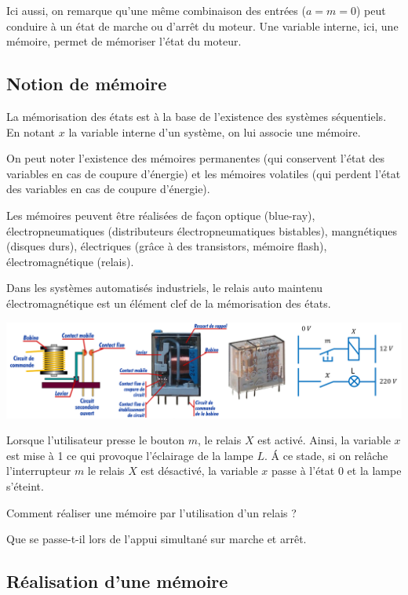 \documentclass[10pt]{article}
\begin{document}
Ici aussi, on remarque qu'une même combinaison des entrées ($a=m=0$) peut conduire à un état de marche ou d'arrêt du moteur. Une variable interne, ici, une mémoire, permet de mémoriser l'état du moteur. 

\subsection{Notion de mémoire}

La mémorisation des états est à la base de l'existence des systèmes séquentiels. En notant $x$ la variable interne d'un système, on lui associe une mémoire.

 On peut noter l'existence des mémoires permanentes (qui conservent l'état des variables en cas de coupure d'énergie) et les mémoires volatiles (qui perdent l'état des variables en cas de coupure d'énergie).  
 
 Les mémoires peuvent être réalisées de façon optique (blue-ray), électropneumatiques (distributeurs électropneumatiques bistables), mangnétiques (disques durs), électriques (grâce à des transistors, mémoire flash), électromagnétique (relais). 
 
 Dans les systèmes automatisés industriels, le relais auto maintenu électromagnétique est un élément clef de la mémorisation des états. 

\begin{center}
\includegraphics[width=\textwidth]{images/relais}
\end{center}

Lorsque l'utilisateur presse le bouton $m$, le relais $X$ est activé. Ainsi, la variable $x$ est mise à 1 ce qui provoque l'éclairage de la lampe $L$. \'A ce stade, si on relâche l'interrupteur $m$ le relais $X$ est désactivé, la variable $x$ passe à l'état 0 et la lampe s'éteint.

\begin{prob}
Comment réaliser une mémoire par l'utilisation d'un relais ? 

Que se passe-t-il lors de l'appui simultané sur marche et arrêt. 
\end{prob}

\subsection{Réalisation d'une mémoire}
\end{document}
